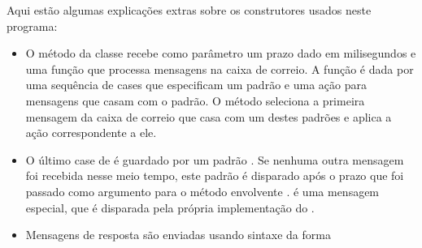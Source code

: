 Aqui estão algumas explicações extras sobre os construtores usados neste programa:
\begin{itemize}
\item
O método  da classe  recebe como parâmetro um prazo dado
em milisegundos e uma função que processa mensagens na caixa de correio. A função é dada
por uma sequência de cases que especificam um padrão e uma ação para mensagens que 
casam com o padrão. O método  seleciona a primeira mensagem da 
caixa de correio que casa com um destes padrões e aplica a ação correspondente a ele. 


\item
O último case de  é guardado por um padrão .  
Se nenhuma outra mensagem foi recebida nesse meio tempo, este padrão é disparado
após o prazo que foi passado como argumento para o método envolvente .
 é uma mensagem especial, que é disparada pela própria implementação do 
.    

\item
Mensagens de resposta são enviadas usando sintaxe da forma


\end{itemize}
